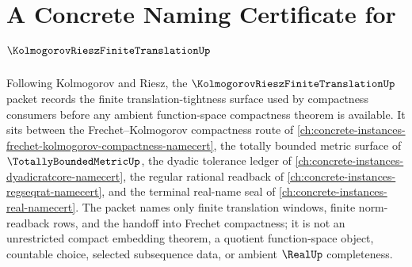 \chapter{A Concrete Naming Certificate for $\KolmogorovRieszFiniteTranslationUp$}
\label{ch:concrete-instances-kolmogorov-riesz-finite-translation-namecert}

Following Kolmogorov and Riesz, the $\KolmogorovRieszFiniteTranslationUp$ packet records the finite translation-tightness surface used by compactness consumers before any ambient function-space compactness theorem is available. It sits between the Frechet--Kolmogorov compactness route of \autoref{ch:concrete-instances-frechet-kolmogorov-compactness-namecert}, the totally bounded metric surface of $\TotallyBoundedMetricUp$, the dyadic tolerance ledger of \autoref{ch:concrete-instances-dyadicratcore-namecert}, the regular rational readback of \autoref{ch:concrete-instances-regseqrat-namecert}, and the terminal real-name seal of \autoref{ch:concrete-instances-real-namecert}. The packet names only finite translation windows, finite norm-readback rows, and the handoff into Frechet compactness; it is not an unrestricted compact embedding theorem, a quotient function-space object, countable choice, selected subsequence data, or ambient $\RealUp$ completeness.

